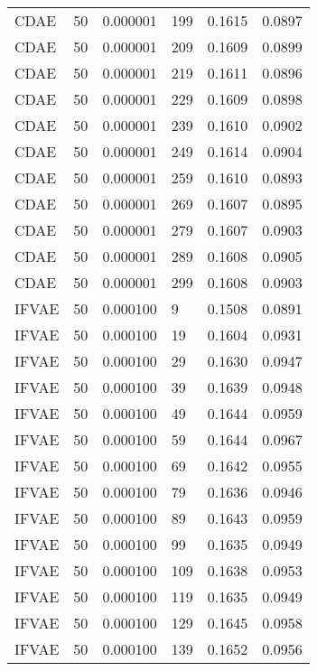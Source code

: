 \begin{tabular}{llrlrr}
    CDAE &   50 &  0.000001 &   199 &  0.1615 &       0.0897 \\
    CDAE &   50 &  0.000001 &   209 &  0.1609 &       0.0899 \\
    CDAE &   50 &  0.000001 &   219 &  0.1611 &       0.0896 \\
    CDAE &   50 &  0.000001 &   229 &  0.1609 &       0.0898 \\
    CDAE &   50 &  0.000001 &   239 &  0.1610 &       0.0902 \\
    CDAE &   50 &  0.000001 &   249 &  0.1614 &       0.0904 \\
    CDAE &   50 &  0.000001 &   259 &  0.1610 &       0.0893 \\
    CDAE &   50 &  0.000001 &   269 &  0.1607 &       0.0895 \\
    CDAE &   50 &  0.000001 &   279 &  0.1607 &       0.0903 \\
    CDAE &   50 &  0.000001 &   289 &  0.1608 &       0.0905 \\
    CDAE &   50 &  0.000001 &   299 &  0.1608 &       0.0903 \\
   IFVAE &   50 &  0.000100 &     9 &  0.1508 &       0.0891 \\
   IFVAE &   50 &  0.000100 &    19 &  0.1604 &       0.0931 \\
   IFVAE &   50 &  0.000100 &    29 &  0.1630 &       0.0947 \\
   IFVAE &   50 &  0.000100 &    39 &  0.1639 &       0.0948 \\
   IFVAE &   50 &  0.000100 &    49 &  0.1644 &       0.0959 \\
   IFVAE &   50 &  0.000100 &    59 &  0.1644 &       0.0967 \\
   IFVAE &   50 &  0.000100 &    69 &  0.1642 &       0.0955 \\
   IFVAE &   50 &  0.000100 &    79 &  0.1636 &       0.0946 \\
   IFVAE &   50 &  0.000100 &    89 &  0.1643 &       0.0959 \\
   IFVAE &   50 &  0.000100 &    99 &  0.1635 &       0.0949 \\
   IFVAE &   50 &  0.000100 &   109 &  0.1638 &       0.0953 \\
   IFVAE &   50 &  0.000100 &   119 &  0.1635 &       0.0949 \\
   IFVAE &   50 &  0.000100 &   129 &  0.1645 &       0.0958 \\
   IFVAE &   50 &  0.000100 &   139 &  0.1652 &       0.0956 \\

\end{tabular}
